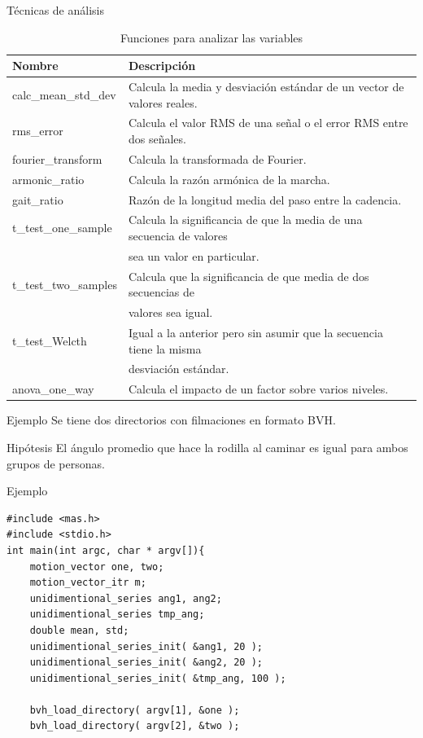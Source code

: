 \documentclass[aspectratio=169,spanish]{beamer} %
\newcommand{\mono}[1]{{\ttfamily #1}}
\begin{document}
\begin{frame}{Técnicas de análisis}
\begin{table}
    \centering
    \caption{Funciones para analizar las variables}
    \label{tab:analytics}
    \scriptsize
    \begin{tabular}{ll}
        \toprule
        Nombre & Descripción \\
        \midrule
        \mono{calc\_mean\_std\_dev} & Calcula la media y desviación estándar de un vector de valores reales. \\
        \mono{rms\_error} & Calcula el valor RMS de una señal o el error RMS entre dos señales. \\
        \mono{fourier\_transform} & Calcula la transformada de Fourier. \\
        \midrule
        \mono{armonic\_ratio} & Calcula la razón armónica de la marcha. \\
        \mono{gait\_ratio} & Razón de la longitud media del paso entre la cadencia. \\
        \midrule
        \mono{t\_test\_one\_sample} & Calcula la significancia de que la media de una secuencia de valores \\ &  sea un valor en particular. \\
        \mono{t\_test\_two\_samples} & Calcula que la significancia de que media de dos secuencias de \\ & valores sea igual. \\
        \mono{t\_test\_Welcth} & Igual a la anterior pero sin asumir que la secuencia tiene la misma \\ & desviación estándar. \\
        \mono{anova\_one\_way} & Calcula el impacto de un factor sobre varios niveles. \\
        \bottomrule
    \end{tabular}
\end{table}
\end{frame}

\begin{frame}{Ejemplo}
    Se tiene dos directorios con filmaciones en formato BVH.
    \begin{block}{Hipótesis}
        El ángulo promedio que hace la rodilla al caminar es igual para ambos grupos de personas.         
    \end{block}
\end{frame}

\begin{frame}[fragile]{Ejemplo}  
\begin{verbatim}
#include <mas.h>
#include <stdio.h>
int main(int argc, char * argv[]){
    motion_vector one, two;
    motion_vector_itr m;
    unidimentional_series ang1, ang2;
    unidimentional_series tmp_ang;
    double mean, std;
    unidimentional_series_init( &ang1, 20 );
    unidimentional_series_init( &ang2, 20 );
    unidimentional_series_init( &tmp_ang, 100 );

    bvh_load_directory( argv[1], &one );
    bvh_load_directory( argv[2], &two );
\end{verbatim}
\end{frame}
\end{document}
